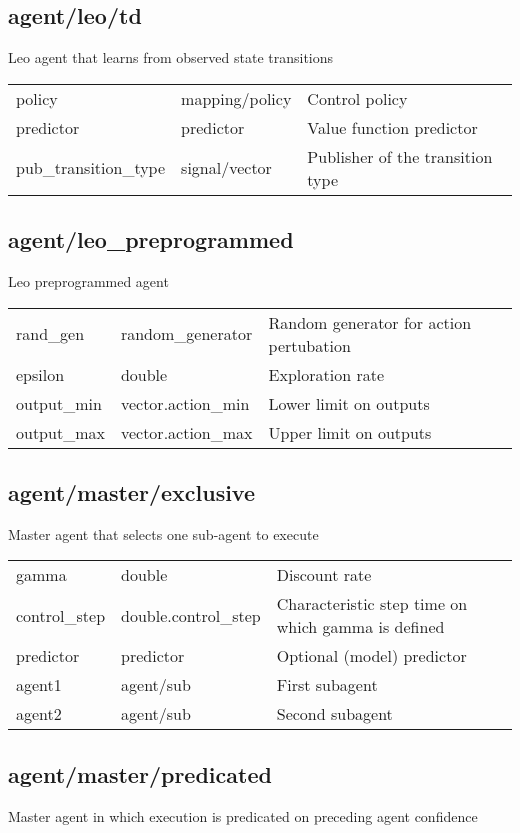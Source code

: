 \subsection{agent/leo/td}
\noindent Leo agent that learns from observed state transitions\\

\noindent\begin{tabular}{@{}lll@{}}
policy&mapping/policy&Control policy\\
predictor&predictor&Value function predictor\\
pub\_transition\_type&signal/vector&Publisher of the transition type\\
\end{tabular}
\subsection{agent/leo\_preprogrammed}
\noindent Leo preprogrammed agent\\

\noindent\begin{tabular}{@{}lll@{}}
rand\_gen&random\_generator&Random generator for action pertubation\\
epsilon&double&Exploration rate\\
output\_min&vector.action\_min&Lower limit on outputs\\
output\_max&vector.action\_max&Upper limit on outputs\\
\end{tabular}
\subsection{agent/master/exclusive}
\noindent Master agent that selects one sub-agent to execute\\

\noindent\begin{tabular}{@{}lll@{}}
gamma&double&Discount rate\\
control\_step&double.control\_step&Characteristic step time on which gamma is defined\\
predictor&predictor&Optional (model) predictor\\
agent1&agent/sub&First subagent\\
agent2&agent/sub&Second subagent\\
\end{tabular}
\subsection{agent/master/predicated}
\noindent Master agent in which execution is predicated on preceding agent confidence\\

